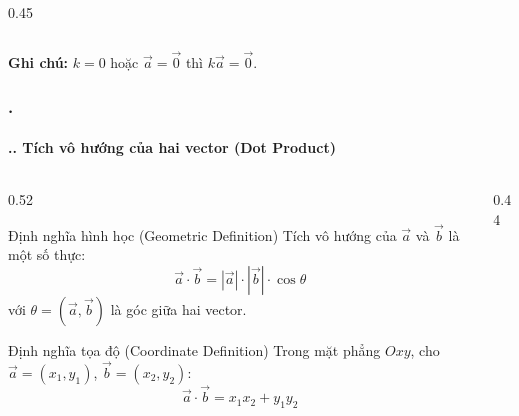 \documentclass[11pt, aspectratio=169]{beamer}
\begin{document}
\begin{frame}[fragile]
\begin{columns}[T, onlytextwidth]
\begin{column}{0.45\textwidth}
        \end{column}
    \end{columns}

    \vspace{0.2cm}
    \begin{center}
        \footnotesize \textbf{Ghi chú:} $k=0$ hoặc $\vec{a}=\vec{0}$ thì $k\vec{a}=\vec{0}$.
    \end{center}
\end{frame}


\begin{frame}[fragile]
    \frametitle{\thesection. \insertsection}
    \framesubtitle{\thesection.\thesubsection. Tích vô hướng của hai vector (Dot Product)}

    \begin{columns}[T, onlytextwidth]
        \begin{column}{0.52\textwidth}
            \begin{block}{Định nghĩa hình học (Geometric Definition)}
                \footnotesize
                Tích vô hướng của $\vec{a}$ và $\vec{b}$ là một số thực:
                \[
                    \vec{a} \cdot \vec{b} = |\vec{a}| \cdot |\vec{b}| \cdot \cos\theta
                \]
                với $\theta = (\vec{a}, \vec{b})$ là góc giữa hai vector.
            \end{block}
            
            \vspace{0.3cm}
            
            \begin{block}{Định nghĩa tọa độ (Coordinate Definition)}
                \footnotesize
                Trong mặt phẳng $Oxy$, cho $\vec{a} = (x_1, y_1)$, $\vec{b} = (x_2, y_2)$:
                \[
                    \vec{a} \cdot \vec{b} = x_1 x_2 + y_1 y_2
                \]
            \end{block}
        \end{column}
        
        \begin{column}{0.44\textwidth}
            \centering
\end{column}
\end{columns}
\end{frame}
\end{document}
